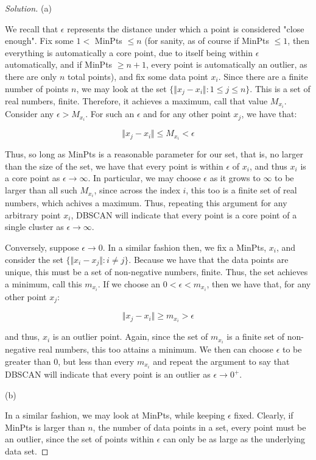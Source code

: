 \documentclass[10pt]{article}
\begin{document}
\begin{proof}[Solution]

(a)

We recall that $\epsilon$ represents the distance under which a point is considered "close enough". Fix some $1 < $ MinPts $ \leq n$ (for sanity, as of course if MinPts $\leq 1$, then everything is automatically a core point, due to itself being within $\epsilon$ automatically, and if MinPts $\geq n+1$, every point is automatically an outlier, as there are only $n$ total points), and fix some data point $x_i$. Since there are a finite number of points $n$, we may look at the set $\{ \Vert x_j - x_i \Vert : 1 \leq j \leq n \}$. This is a set of real numbers, finite. Therefore, it achieves a maximum, call that value $M_{x_i}$. Consider any $\epsilon > M_{x_i}$. For such an $\epsilon$ and for any other point $x_j$, we have that:

$$ \Vert x_j - x_i \Vert \leq M_{x_i}  < \epsilon $$

Thus, so long as MinPts is a reasonable parameter for our set, that is, no larger than the size of the set, we have that every point is within $\epsilon$ of $x_i$, and thus $x_i$ is a core point as $\epsilon \to \infty$. In particular, we may choose $\epsilon$ as it grows to $\infty$ to be larger than all such $M_{x_i}$, since across the index $i$, this too is a finite set of real numbers, which achives a maximum. Thus, repeating this argument for any arbitrary point $x_i$, DBSCAN will indicate that every point is a core point of a single cluster as $\epsilon \to \infty$.

Conversely, suppose $\epsilon \to 0$. In a similar fashion then, we fix a MinPts, $x_i$, and consider the set $\{ \Vert x_i - x_j \Vert : i \not = j \}$. Because we have that the data points are unique, this must be a set of non-negative numbers, finite. Thus, the set achieves a minimum, call this $m_{x_i}$. If we choose an $0 < \epsilon < m_{x_i}$, then we have that, for any other point $x_j$:

$$  \Vert x_j - x_i \Vert \geq m_{x_i}  > \epsilon$$

and thus, $x_i$ is an outlier point. Again, since the set of $m_{x_i}$ is a finite set of non-negative real numbers, this too attains a minimum. We then can choose $\epsilon$ to be greater than 0, but less than every $m_{x_i}$ and repeat the argument to say that DBSCAN will indicate that every point is an outlier as $\epsilon \to 0^+$.

(b)

In a similar fashion, we may look at MinPts, while keeping $\epsilon$ fixed. Clearly, if MinPts is larger than $n$, the number of data points in a set, every point must be an outlier, since the set of points within $\epsilon$ can only be as large as the underlying data set. 


\end{proof}
\end{document}

